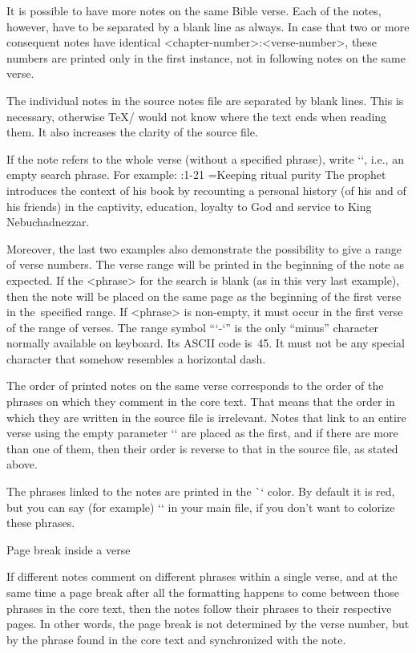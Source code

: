 It is  possible to have more notes on the same Bible verse. Each of the notes, however, have to be separated by a blank line as always. 
In case that two or more consequent notes have identical <chapter-number>:<verse-number>, these numbers are printed only in the first instance, not in following notes on the same verse.

The individual notes in the source notes file are separated by blank
lines. This is necessary, otherwise \TeX/ would not know where the text ends when reading them. 
It also increases the clarity of the source file. 

If the note refers to the whole verse (without a specified phrase), write
`{}`, i.e., an empty search phrase. For example:
\begtt
{}:1-21 {}={Keeping ritual purity}
The prophet introduces the context of his book by recounting a personal history
(of his and of his friends) in the captivity, education, loyalty to God and service 
to King Nebuchadnezzar.
\endtt

Moreover, the last two examples also demonstrate the possibility to give a range of verse numbers.
The verse range will be printed in the beginning of the note as expected.
If the <phrase> for the search is blank (as in this very last example), then the note
will be placed on the same page as the beginning of the first verse in the~specified range.
If <phrase> is non-empty, it must occur in the first verse of the range of verses. 
The range symbol “`-`” is the only “minus” character normally available on
keyboard. Its ASCII code is~45. It must not be any special character that somehow resembles a horizontal 
dash.


The order of printed notes on the same verse corresponds to the order of the phrases on which
they comment in the core text. That means that the order in which they are written 
in the source file is irrelevant. Notes that link to an entire verse using the empty parameter `{}`  are placed as the first, and if there are more than one of them, then their order is reverse to that in the source file, as stated above.

The phrases linked to the notes are printed in the \`\notecolor` color. By default it is red, but you can say (for example) `\let\notecolor=\relax` in your main file, if you don't want to colorize these phrases.


 Page break inside a verse  

If different notes comment on different phrases within a single verse, and at the same time a page break after all the formatting happens to come between those phrases in the core text, then the notes follow their phrases to their respective pages. In other words, the page break is not determined by the verse number, but by the phrase found  in the core text and synchronized with the note. 

